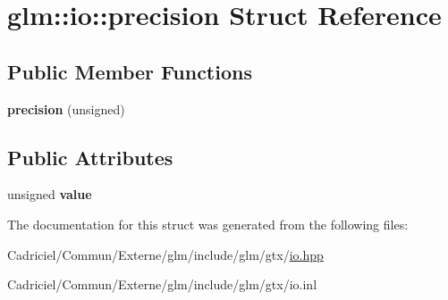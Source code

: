 \hypertarget{structglm_1_1io_1_1precision}{}\section{glm\+:\+:io\+:\+:precision Struct Reference}
\label{structglm_1_1io_1_1precision}
\subsection*{Public Member Functions}
\begin{DoxyCompactItemize}
\item 
{\bfseries precision} (unsigned)\hypertarget{structglm_1_1io_1_1precision_aa359e1766fd74b88e049d5449d521447}{}\label{structglm_1_1io_1_1precision_aa359e1766fd74b88e049d5449d521447}

\end{DoxyCompactItemize}
\subsection*{Public Attributes}
\begin{DoxyCompactItemize}
\item 
unsigned {\bfseries value}\hypertarget{structglm_1_1io_1_1precision_a43da772dff9a209768c63f1220d52074}{}\label{structglm_1_1io_1_1precision_a43da772dff9a209768c63f1220d52074}

\end{DoxyCompactItemize}


The documentation for this struct was generated from the following files\+:\begin{DoxyCompactItemize}
\item 
Cadriciel/\+Commun/\+Externe/glm/include/glm/gtx/\hyperlink{io_8hpp}{io.\+hpp}\item 
Cadriciel/\+Commun/\+Externe/glm/include/glm/gtx/io.\+inl\end{DoxyCompactItemize}
